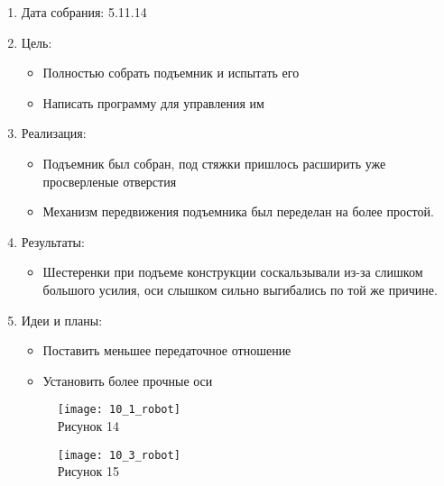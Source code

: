 
	\begin{enumerate}
		\item Дата собрания: 5.11.14
		\item Цель:
		\begin{itemize}
			\item Полностью собрать подъемник и испытать его
			\item Написать программу для управления им
		\end{itemize}			
		\item Реализация:
		\begin{itemize}
			\item Подъемник был собран, под стяжки пришлось расширить уже просверленые отверстия
			\item Механизм передвижения подъемника был переделан на более простой.
		\end{itemize}
		\item Результаты:
		\begin{itemize}
			\item Шестеренки при подъеме конструкции соскальзывали из-за слишком большого усилия, оси слышком сильно выгибались по той же причине.
		\end{itemize}
		\item Идеи и планы:
		\begin{itemize}
			\item Поставить меньшее передаточное отношение
			\item Установить более прочные оси
		\end{itemize}
		\begin{figure} [h]
			\centering
			\begin{minipage}{0.3\linewidth}
				\texttt{[image: 10\_1\_robot]}\\ Рисунок 14
			\end{minipage}
			\begin{minipage}{0.3\linewidth}
				\texttt{[image: 10\_3\_robot]}\\ Рисунок 15
			\end{minipage}
		\end{figure}
	\end{enumerate}
\newpage